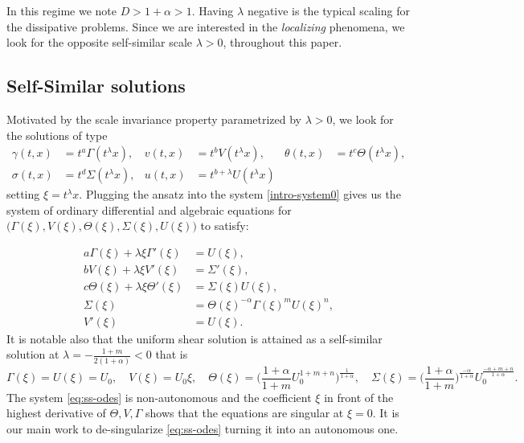\documentclass[a4paper,11pt]{article}
\theoremstyle{remark}
\begin{document}
In this regime we note $D>1+\alpha>1$. Having $\lambda$ negative is the typical scaling for the dissipative problems. Since we are interested in the {\it localizing} phenomena, we look for the opposite self-similar scale $\lambda>0$, throughout this paper. %

\subsection{Self-Similar solutions}
Motivated by the scale invariance property parametrized by $\lambda>0$, we look for the solutions of type
\begin{equation}\label{eq:ORItoCAP}
\begin{aligned}
 \gamma(t,x) &= t^a\Gamma(t^\lambda x), & v(t,x) &= t^b V(t^\lambda x), &\theta(t,x) &= t^c \Theta(t^\lambda x),\\
 \sigma(t,x) &= t^d \Sigma(t^\lambda x), & u(t,x) &= t^{b+\lambda} U(t^\lambda x)
\end{aligned}
\end{equation}
setting $\xi = t^\lambda x$. Plugging the ansatz into the system \eqref{intro-system0} gives us the system of ordinary differential and algebraic equations for $\big(\Gamma(\xi), V(\xi), \Theta(\xi), \Sigma(\xi), U(\xi)\big)$ to satisfy:

\begin{equation}
\begin{aligned}
 a \Gamma(\xi) + \lambda \xi \Gamma'(\xi) &= U(\xi),\\
 b V(\xi) + \lambda \xi V'(\xi) &= \Sigma'(\xi),\\
 c \Theta(\xi) + \lambda \xi \Theta'(\xi)&=\Sigma(\xi) U(\xi),\\
 \Sigma(\xi) &= \Theta(\xi)^{-\alpha} \Gamma(\xi)^m U(\xi)^n,\\
 V'(\xi)&=U(\xi).
\end{aligned} \label{eq:ss-odes}
\end{equation}
It is notable also that the uniform shear solution is attained as a self-similar solution at $\lambda = -\frac{1+m}{2(1+\alpha)}<0$ that is
\begin{equation*}
 \Gamma(\xi) = U(\xi)=U_0, \quad V(\xi) = U_0\xi, \quad  \Theta(\xi) = \Big( \frac{1+\alpha}{1+m} U_0^{1+m+n}\Big)^{\frac{1}{1+\alpha}}, \quad \Sigma(\xi) = \Big(\frac{1+\alpha}{1+m}\Big)^{\frac{-\alpha}{1+\alpha}} U_0^{\frac{-\alpha+m+n}{1+\alpha}}.
\end{equation*}
The system \eqref{eq:ss-odes} is non-autonomous and the coefficient $\xi$ in front of the highest derivative of $\Theta, V, \Gamma$ shows that the equations are singular at $\xi=0$.
It is our main work to de-singularize \eqref{eq:ss-odes} turning it into an autonomous one.
\end{document}
